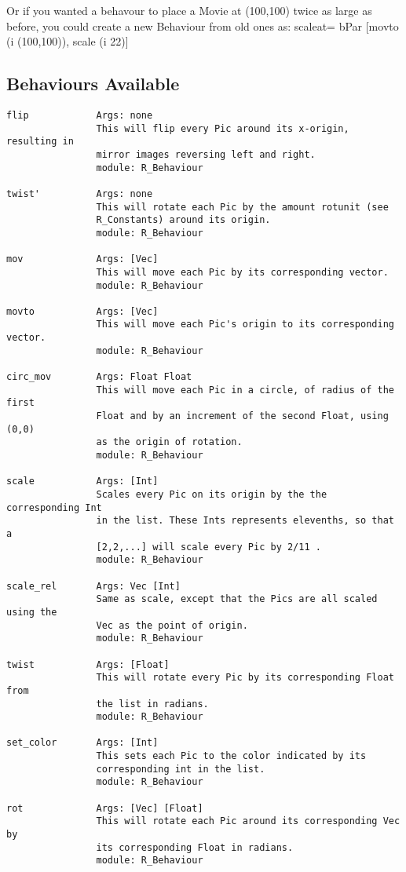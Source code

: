 	Or if you wanted a behavour to place a Movie at (100,100) twice as
large as before, you could create a new Behaviour from old ones as:
    scaleat= bPar [movto (i (100,100)), scale (i 22)]

\subsection{Behaviours Available}
\begin{verbatim}
flip            Args: none
                This will flip every Pic around its x-origin, resulting in
                mirror images reversing left and right.
                module: R_Behaviour
 		
twist'          Args: none
                This will rotate each Pic by the amount rotunit (see 
                R_Constants) around its origin.
                module: R_Behaviour

mov             Args: [Vec]
                This will move each Pic by its corresponding vector.
                module: R_Behaviour

movto           Args: [Vec]
                This will move each Pic's origin to its corresponding vector.
                module: R_Behaviour

circ_mov        Args: Float Float
                This will move each Pic in a circle, of radius of the first
                Float and by an increment of the second Float, using (0,0)
                as the origin of rotation.
                module: R_Behaviour

scale           Args: [Int]
                Scales every Pic on its origin by the the corresponding Int
                in the list. These Ints represents elevenths, so that a 
                [2,2,...] will scale every Pic by 2/11 .
                module: R_Behaviour

scale_rel       Args: Vec [Int]	
                Same as scale, except that the Pics are all scaled using the
                Vec as the point of origin.
                module: R_Behaviour

twist           Args: [Float]
                This will rotate every Pic by its corresponding Float from
                the list in radians.
                module: R_Behaviour

set_color       Args: [Int]
                This sets each Pic to the color indicated by its 
                corresponding int in the list.
                module: R_Behaviour
	
rot             Args: [Vec] [Float]
                This will rotate each Pic around its corresponding Vec by
                its corresponding Float in radians.
                module: R_Behaviour


\end{verbatim}
